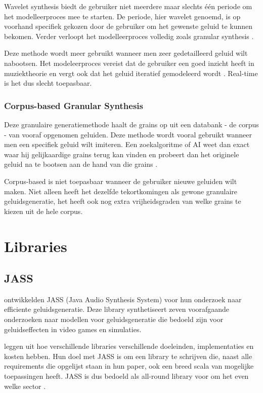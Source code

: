 Wavelet synthesis biedt de gebruiker niet meerdere maar slechts één periode om het modelleerproces mee te starten. De periode, hier wavelet genoemd, is op voorhand specifiek gekozen door de gebruiker om het gewenste geluid te kunnen bekomen. Verder verloopt het modelleerproces volledig zoals granular synthesis \autocite{wavelet}.

Deze methode wordt meer gebruikt wanneer men zeer gedetailleerd geluid wilt nabootsen. Het modeleerproces vereist dat de gebruiker een goed inzicht heeft in muziektheorie en vergt ook dat het geluid iteratief gemodeleerd wordt 
\autocite{wavelet}. Real-time is het dus slecht toepasbaar.

\subsubsection{Corpus-based Granular Synthesis}

Deze granulaire generatiemethode haalt de grains op uit een databank - de corpus - van vooraf opgenomen geluiden. Deze methode wordt vooral gebruikt wanneer men een specifiek geluid wilt imiteren. Een zoekalgoritme of AI weet dan exact waar hij gelijkaardige grains terug kan vinden en probeert dan het originele geluid na te bootsen aan de hand van die grains 
\autocite{methodes}.

Corpus-based is niet toepasbaar wanneer de gebruiker nieuwe geluiden wilt maken. Niet alleen heeft het dezelfde tekortkomingen als gewone granulaire geluidsgeneratie, het heeft ook nog extra vrijheidsgraden van welke grains te kiezen uit de hele corpus.

\section{Libraries}
\label{sec:libraries}

\subsection{JASS}

\textcite{jass} ontwikkelden JASS (Java Audio Synthesis System) voor hun onderzoek naar efficiente geluidsgeneratie. Deze library synthetiseert zeven voorafgaande onderzoeken naar modellen voor geluidsgeneratie die bedoeld zijn voor geluidseffecten in video games en simulaties. 

\textcite{jass} leggen uit hoe verschillende libraries verschillende doeleinden, implementaties en kosten hebben. Hun doel met JASS is om een library te schrijven die, naast alle requirements die opgelijst staan in hun paper, ook een breed scala van mogelijke toepassingen heeft. JASS is dus bedoeld als all-round library voor om het even welke sector \autocite{jass}.

